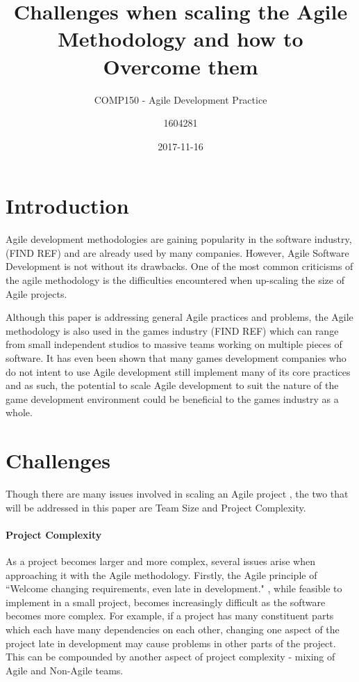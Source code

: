 \documentclass{scrartcl}
\title{Challenges when scaling the Agile Methodology and how to Overcome them}
\subtitle{COMP150 - Agile Development Practice}
\date{2017-11-16}
\author{1604281}
\begin{document}
\maketitle
{}



\section{Introduction}

Agile development methodologies are gaining popularity in the software industry, (FIND REF) and are already used by many companies. However, Agile Software Development is not without its drawbacks. One of the most common criticisms of the agile methodology is the difficulties encountered when up-scaling the size of Agile projects. \cite{begel2007usage}

Although this paper is addressing general Agile practices and problems, the Agile methodology is also used in the games industry (FIND REF) which can range from small independent studios to massive teams working on multiple pieces of software. It has even been shown that many games development companies who do not intent to use Agile development still implement many of its core practices \cite{petrillo2010agility} and as such, the potential to scale Agile development to suit the nature of the game development environment could be beneficial to the games industry as a whole. 

\section{Challenges}

Though there are many issues involved in scaling an Agile project \cite{turk2014limitations}, the two that will be addressed in this paper are Team Size and Project Complexity. 

\paragraph{Project Complexity}\mbox{}\newline

As a project becomes larger and more complex, several issues arise when approaching it with the Agile methodology. Firstly, the Agile principle of ``Welcome changing requirements, even late in development." \cite{AgileManifesto}, while feasible to implement in a small project, becomes increasingly difficult as the software becomes more complex. For example, if a project has many constituent parts which each have many dependencies on each other, changing one aspect of the project late in development may cause problems in other parts of the project. This can be compounded by another aspect of project complexity - mixing of Agile and Non-Agile teams.
\end{document}
